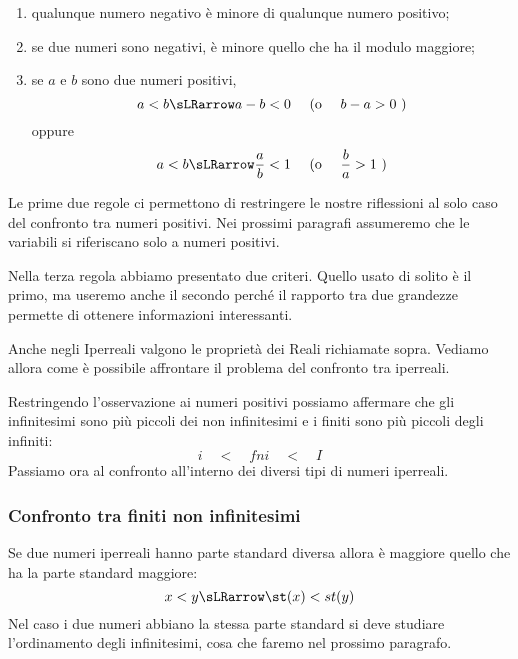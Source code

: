 \begin{enumerate} [noitemsep]
 \item qualunque numero negativo è minore di qualunque numero positivo;
 \item se due numeri sono negativi, è minore quello che ha il modulo 
maggiore;
 \item se \(a\) e \(b\) sono due numeri positivi, 
 \[a<b \sLRarrow a-b<0 \quad \text{ (o } \quad b-a>0 \text{ )}\]
oppure
 \[a<b \sLRarrow \frac{a}{b}<1 \quad \text{ (o } \quad \frac{b}{a}>1 
   \text{ )}\]
\end{enumerate}

\begin{osservazione}
Le prime due regole ci permettono di restringere le nostre riflessioni al 
solo caso del confronto tra numeri positivi.
Nei prossimi paragrafi assumeremo che le variabili si riferiscano solo a 
numeri positivi.
\end{osservazione}

\begin{osservazione}
Nella terza regola abbiamo presentato due criteri. Quello usato di solito
è il primo, ma useremo anche il secondo perché il rapporto tra due 
grandezze permette di ottenere informazioni interessanti.
\end{osservazione}

\vspace{1em}

Anche negli Iperreali valgono le proprietà dei Reali richiamate sopra. 
Vediamo allora come è possibile affrontare il problema del confronto tra 
iperreali.

Restringendo l'osservazione ai numeri positivi possiamo affermare che gli 
infinitesimi sono più piccoli dei non infinitesimi e i finiti sono più 
piccoli degli infiniti:
\[i \quad < \quad fni \quad < \quad I\]
Passiamo ora al confronto all'interno dei diversi tipi di numeri iperreali.

\subsubsection{Confronto tra finiti non infinitesimi}
\label{subsubsec:insnum_confrontoreali}

Se due numeri iperreali hanno parte standard diversa allora è maggiore 
quello 
che ha la parte standard maggiore:
\[x < y \sLRarrow \st(x) < st(y)\]
Nel caso i due numeri abbiano la stessa parte standard si deve studiare 
l'ordinamento degli infinitesimi, cosa che faremo nel prossimo paragrafo.

